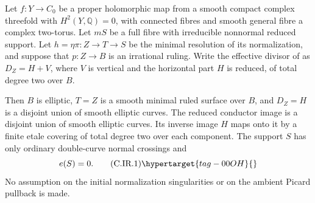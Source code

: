 \begin{proposition}\hypertarget{tag-01C3}{}\label{cdp:st:C.2.IRR.1}


Let $f:Y\to C_0$ be a proper holomorphic map from a smooth compact
complex threefold with $H^2(Y,\mathbb Q)=0$, with connected fibres
and smooth general fibre a complex two-torus. Let $mS$ be a full
fibre with irreducible nonnormal reduced support. Let
$h=\eta\pi:Z\to T\to S$ be the minimal resolution of its
normalization, and suppose that $p:Z\to B$ is an irrational
ruling. Write the effective divisor of  as
$D_Z=H+V$, where $V$ is vertical and the horizontal part $H$
is reduced, of total degree two over $B$.

Then $B$ is elliptic, $T=Z$ is a smooth minimal ruled surface
over $B$, and $D_Z=H$ is a disjoint union of smooth elliptic
curves. The reduced conductor image is a disjoint union of
smooth elliptic curves. Its inverse image $H$ maps onto it
by a finite etale covering of total degree two over each
component. The support $S$ has only ordinary double-curve
normal crossings and
\[
                         e(S)=0.                 \tag{C.IR.1}\hypertarget{tag-00OH}{}\label{cdp:eq:C.IR.1}
\]
No assumption on the initial normalization singularities or
on the ambient Picard pullback is made.
\end{proposition}
